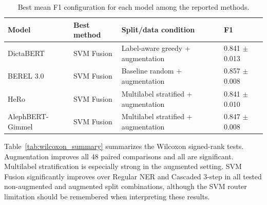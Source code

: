 \documentclass[12pt,a4paper]{report}
\begin{document}
\begin{table}[htbp]
\centering
\small
\caption{Best mean F1 configuration for each model among the reported methods.}
\label{tab:best_by_model}
\begin{tabular}{llll}
\toprule
Model & Best method & Split/data condition & F1 \\
\midrule
DictaBERT & SVM Fusion & Label-aware greedy + augmentation & 0.841 $\pm$ 0.013 \\
BEREL 3.0 & SVM Fusion & Baseline random + augmentation & 0.857 $\pm$ 0.008 \\
HeRo & SVM Fusion & Multilabel stratified + augmentation & 0.841 $\pm$ 0.010 \\
AlephBERT-Gimmel & SVM Fusion & Multilabel stratified + augmentation & 0.847 $\pm$ 0.008 \\
\bottomrule
\end{tabular}
\end{table}

Table~\ref{tab:wilcoxon_summary} summarizes the Wilcoxon signed-rank tests. Augmentation improves all 48 paired comparisons and all are significant. Multilabel stratification is especially strong in the augmented setting. SVM Fusion significantly improves over Regular NER and Cascaded 3-step in all tested non-augmented and augmented split combinations, although the SVM router limitation should be remembered when interpreting these results.
\end{document}
